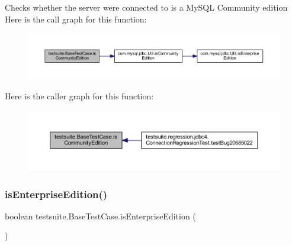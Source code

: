 Checks whether the server we\textquotesingle{}re connected to is a My\+S\+QL Community edition Here is the call graph for this function\+:
\nopagebreak
\begin{figure}[H]
\begin{center}
\leavevmode
\includegraphics[width=350pt]{classtestsuite_1_1_base_test_case_a30a8a94757291826321a07c5b10a6233_cgraph}
\end{center}
\end{figure}
Here is the caller graph for this function\+:
\nopagebreak
\begin{figure}[H]
\begin{center}
\leavevmode
\includegraphics[width=350pt]{classtestsuite_1_1_base_test_case_a30a8a94757291826321a07c5b10a6233_icgraph}
\end{center}
\end{figure}
\mbox{\label{classtestsuite_1_1_base_test_case_ae29a3a848b87638921a7078f572b3f83}} 
\subsubsection{\texorpdfstring{is\+Enterprise\+Edition()}{isEnterpriseEdition()}}
{\footnotesize\ttfamily boolean testsuite.\+Base\+Test\+Case.\+is\+Enterprise\+Edition (\begin{DoxyParamCaption}{ }\end{DoxyParamCaption})\hspace{0.3cm}{\ttfamily [protected]}}

